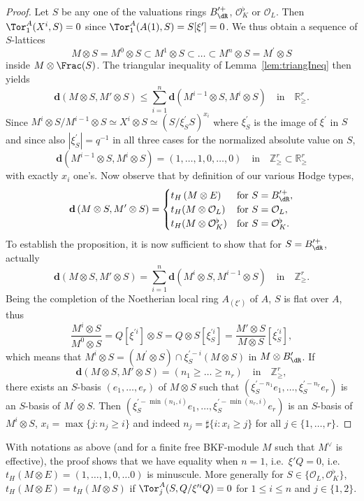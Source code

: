 \begin{proof}
Let $S$ be any one of the valuations rings $B_{\dR}^{\prime+}$, $\mathcal{O}_{K}^{\flat}$ or $\mathcal{O}_{L}$. Then $\Tor_{1}^{A}(X^{i},S)=0$ since $\Tor_{1}^{A}(A(1),S)=S[\xi^{\prime}]=0$. We thus obtain a sequence of $S$-lattices
\[
M\otimes S=M^{0}\otimes S\subset M^{1}\otimes S\subset\dots\subset M^{n}\otimes S=M^{\prime}\otimes S
\]
inside $M\otimes\Frac(S)$. The triangular inequality of Lemma~\ref{lem:triangIneq} then yields
\[
\mathbf{d}\left(M\otimes S,M'\otimes S\right)\leq\sum_{i=1}^{n}\mathbf{d}\left(M^{i-1}\otimes S,M^{i}\otimes S\right)\quad\text{in}\quad\mathbb{R}_{\geq}^{r}.
\]
Since $M^{i}\otimes S/M^{i-1}\otimes S\simeq X^{i}\otimes S\simeq(S/\xi_{S}^{\prime}S)^{x_{i}}$ where $\xi_{S}^{\prime}$ is the image of $\xi^{\prime}$ in $S$ and since also $\left|\xi_{S}^{\prime}\right|=q^{-1}$ in all three cases for the normalized absolute value on $S$,
\[
\mathbf{d}\left(M^{i-1}\otimes S,M^{i}\otimes S\right)=(1,\dots,1,0,\dots,0)\quad\text{in}\quad\mathbb{Z}_{\geq}^{r}\subset\mathbb{R}_{\geq}^{r}
\]
with exactly $x_{i}$ one's. Now observe that by definition of our various Hodge types,
\[
\mathbf{d}\left(M\otimes S,M'\otimes S\right)=
\begin{cases}
t_{H}\left(M\otimes E\right) & \text{for }S=B_{\dR}^{\prime+},\\
t_{H}(M\otimes\mathcal{O}_{L}) & \text{for }S=\mathcal{O}_{L},\\
t_{H}(M\otimes\mathcal{O}_{K}^{\flat}) & \text{for }S=\mathcal{O}_{K}^{\flat}.
\end{cases}
\]
To establish the proposition, it is now sufficient to show that for $S=B_{\dR}^{\prime+}$, actually
\[
\mathbf{d}\left(M\otimes S,M'\otimes S\right)=\sum_{i=1}^{n}\mathbf{d}\left(M^{i}\otimes S,M^{i-1}\otimes S\right)\quad\text{in}\quad\mathbb{Z}_{\geq}^{r}.
\]
Being the completion of the Noetherian local ring $A_{(\xi')}$ of $A$, $S$ is flat over $A$, thus
\[
\frac{M^{i}\otimes S}{M^{0}\otimes S}=Q[\xi^{\prime i}]\otimes S=Q\otimes S[\xi_{S}^{\prime i}]=\frac{M'\otimes S}{M\otimes S}[\xi_{S}^{\prime i}],
\]
which means that $M^{i}\otimes S=(M^{\prime}\otimes S)\cap\xi_{S}^{\prime-i}(M\otimes S)$ in $M\otimes B_{\dR}^{\prime}$. If
\[
\mathbf{d}\left(M\otimes S,M'\otimes S\right)=(n_{1}\geq\dots\geq n_{r})\quad\text{in}\quad\mathbb{Z}_{\geq}^{r},
\]
there exists an $S$-basis $(e_{1},\dots,e_{r})$ of $M\otimes S$ such that $(\xi_{S}^{\prime-n_{1}}e_{1},\dots,\xi_{S}^{\prime-n_{r}}e_{r})$ is an $S$-basis of $M^{\prime}\otimes S$. Then $(\xi_{S}^{\prime-\min(n_{1},i)}e_{1},\dots,\xi_{S}^{\prime-\min(n_{r},i)}e_{r})$ is an $S$-basis of $M^{i}\otimes S$, $x_{i}=\max\{j:n_{j}\geq i\}$ and indeed $n_{j}=\sharp\{i:x_{i}\geq j\}$ for all $j\in\{1,\dots,r\}$.
\end{proof}
\begin{rema}
With notations as above (and for a finite free BKF-module $M$ such that $M^{\vee}$ is effective), the proof shows that we have equality when $n=1$, i.e.~$\xi'Q=0$, i.e.~$t_{H}(M\otimes E)=(1,\dots,1,0,\dots0)$ is minuscule. More generally for $S\in\{\mathcal{O}_{L},\mathcal{O}_{K}^{\flat}\}$, $t_{H}(M\otimes E)=t_{H}(M\otimes S)$ if $\Tor_{j}^{A}(S,Q/\xi^{\prime i}Q)=0$ for $1\leq i\leq n$ and $j\in\{1,2\}$.
\end{rema}

